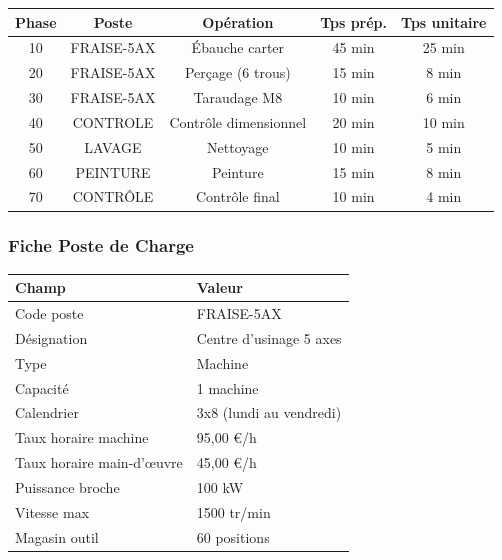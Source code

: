 \documentclass{article}
\begin{document}
\begin{table}[h]
\begin{tcolorbox}[colback=grisclair, colframe=gray!70!black, title=Exemple : Gamme de fabrication - Carter moteur M12]
\begin{tabular}{|c|c|c|c|c|}
\hline
\textbf{Phase} & \textbf{Poste} & \textbf{Opération} & \textbf{Tps prép.} & \textbf{Tps unitaire} \\
\hline
10 & FRAISE-5AX & Ébauche carter & 45 min & 25 min \\
20 & FRAISE-5AX & Perçage (6 trous) & 15 min & 8 min \\
30 & FRAISE-5AX & Taraudage M8 & 10 min & 6 min \\
40 & CONTROLE & Contrôle dimensionnel & 20 min & 10 min \\
50 & LAVAGE & Nettoyage & 10 min & 5 min \\
60 & PEINTURE & Peinture & 15 min & 8 min \\
70 & CONTRÔLE & Contrôle final & 10 min & 4 min \\
\hline
\end{tabular}
\end{tcolorbox}

\subsubsection{Fiche Poste de Charge}

\begin{tcolorbox}[colback=orangeclair, colframe=orange!70!black, title=Exemple : Fiche poste de charge - FRAISE-5AX]
\begin{tabular}{|l|l|}
\hline
\textbf{Champ} & \textbf{Valeur} \\
\hline
Code poste & \textsc{FRAISE-5AX} \\
Désignation & Centre d'usinage 5 axes \\
Type & Machine \\
Capacité & 1 machine \\
Calendrier & 3x8 (lundi au vendredi) \\
Taux horaire machine & 95,00 €/h \\
Taux horaire main-d'œuvre & 45,00 €/h \\
Puissance broche & 100 kW \\
Vitesse max & 1500 tr/min \\
Magasin outil & 60 positions \\
\hline
\end{tabular}
\end{tcolorbox}


\end{table}
\end{document}

